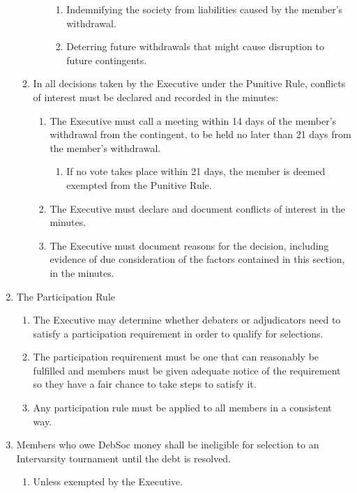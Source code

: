 \begin{enumerate}
\begin{enumerate}
\begin{enumerate}
      \begin{enumerate}
      \item Indemnifying the society from liabilities caused by the member’s withdrawal.
      \item Deterring future withdrawals that might cause disruption to future contingents.
      \end{enumerate}
    \end{enumerate}
  \item In all decisions taken by the Executive under the Punitive Rule, conflicts of interest must be declared and recorded in the minutes:
    \begin{enumerate}
    \item The Executive must call a meeting within 14 days of the member’s withdrawal from the contingent, to be held no later than 21 days from the member’s withdrawal.
      \begin{enumerate}
      \item If no vote takes place within 21 days, the member is deemed exempted from the Punitive Rule.
      \end{enumerate}
    \item The Executive must declare and document conflicts of interest in the minutes.
    \item The Executive must document reasons for the decision, including evidence of due consideration of the factors contained in this section, in the minutes.
    \end{enumerate}
  \end{enumerate}

\item The Participation Rule
  \begin{enumerate}
  \item The Executive may determine whether debaters or adjudicators need to satisfy a participation requirement in order to qualify for selections.
  \item The participation requirement must be one that can reasonably be fulfilled and members must be given adequate notice of the requirement so they have a fair chance to take steps to satisfy it.
  \item Any participation rule must be applied to all members in a consistent way.
  \end{enumerate}

\item Members who owe DebSoc money shall be ineligible for selection to an Intervarsity tournament until the debt is resolved.
  \begin{enumerate}
  \item Unless exempted by the Executive.
  \end{enumerate}


\end{enumerate}
